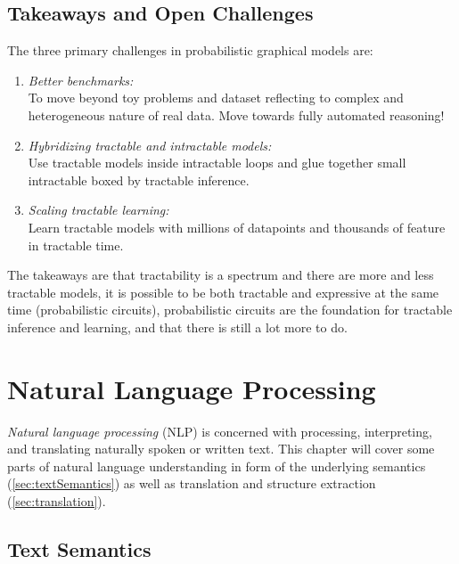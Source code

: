 	\section{Takeaways and Open Challenges}
		The three primary challenges in probabilistic graphical models are:
		\begin{enumerate}
			\item \emph{Better benchmarks:} \\
				To move beyond toy problems and dataset reflecting to complex and heterogeneous nature of real data. Move towards fully automated reasoning!
			\item \emph{Hybridizing tractable and intractable models:} \\
				Use tractable models inside intractable loops and glue together small intractable boxed by tractable inference.
			\item \emph{Scaling tractable learning:} \\
				Learn tractable models with millions of datapoints and thousands of feature in tractable time.
		\end{enumerate}
		The takeaways are that tractability is a spectrum and there are more and less tractable models, it is possible to be both tractable and expressive at the same time (probabilistic circuits), probabilistic circuits are the foundation for tractable inference and learning, and that there is still a lot more to do.

\chapter{Natural Language Processing}
	\emph{Natural language processing} (NLP) is concerned with processing, interpreting, and translating naturally spoken or written text. This chapter will cover some parts of natural language understanding in form of the underlying semantics (\autoref{sec:textSemantics}) as well as translation and structure extraction (\autoref{sec:translation}).

	\section{Text Semantics}
		\label{sec:textSemantics}

